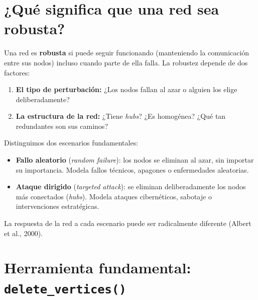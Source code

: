 \documentclass[
  letterpaper,
  DIV=11,
  numbers=noendperiod]{scrreprt}
\providecommand{\tightlist}{%
  \setlength{\itemsep}{0pt}\setlength{\parskip}{0pt}}
\begin{document}
\section{¿Qué significa que una red sea
robusta?}\label{quuxe9-significa-que-una-red-sea-robusta}

Una red es \textbf{robusta} si puede seguir funcionando (manteniendo la
comunicación entre sus nodos) incluso cuando parte de ella falla. La
robustez depende de dos factores:

\begin{enumerate}
\def\labelenumi{\arabic{enumi}.}
\tightlist
\item
  \textbf{El tipo de perturbación:} ¿Los nodos fallan al azar o alguien
  los elige deliberadamente?
\item
  \textbf{La estructura de la red:} ¿Tiene \emph{hubs}? ¿Es homogénea?
  ¿Qué tan redundantes son sus caminos?
\end{enumerate}

\begin{tcolorbox}[enhanced jigsaw, toprule=.15mm, colframe=quarto-callout-tip-color-frame, coltitle=black, titlerule=0mm, colback=white, breakable, leftrule=.75mm, arc=.35mm, bottomtitle=1mm, toptitle=1mm, rightrule=.15mm, bottomrule=.15mm, left=2mm, title=\textcolor{quarto-callout-tip-color}{\faLightbulb}\hspace{0.5em}{💡 Concepto clave}, colbacktitle=quarto-callout-tip-color!10!white, opacityback=0, opacitybacktitle=0.6]

Distinguimos dos escenarios fundamentales:

\begin{itemize}
\tightlist
\item
  \textbf{Fallo aleatorio} (\emph{random failure}): los nodos se
  eliminan al azar, sin importar su importancia. Modela fallos técnicos,
  apagones o enfermedades aleatorias.
\item
  \textbf{Ataque dirigido} (\emph{targeted attack}): se eliminan
  deliberadamente los nodos más conectados (\emph{hubs}). Modela ataques
  cibernéticos, sabotaje o intervenciones estratégicas.
\end{itemize}

La respuesta de la red a cada escenario puede ser radicalmente diferente
(Albert et al., 2000).

\end{tcolorbox}

\section{\texorpdfstring{Herramienta fundamental:
\texttt{delete\_vertices()}}{Herramienta fundamental: delete\_vertices()}}\label{herramienta-fundamental-delete_vertices}
\end{document}
